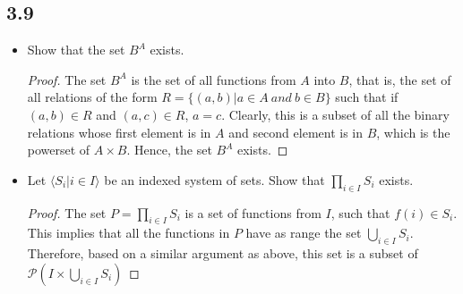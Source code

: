 \subsection*{3.9}

\begin{itemize} 
\item Show that the set $B^{A}$ exists.

\begin{proof}
    The set $B^A$ is the set of all functions from $A$ into $B$, that is, the set of all relations of the form $R = \{(a,b)| a\in A~and~b \in B\}$ such that if $(a,b) \in R$ and $(a, c) \in R$, $a = c$. Clearly, this is a subset of all the binary relations whose first element is in $A$ and second element is in $B$, which is the powerset of $A \times B$. Hence, the set $B^A$ exists.
\end{proof}

\item Let $\langle S_i | i \in I \rangle$ be an indexed system of sets. Show that $\prod_{i \in I} S_i$ exists.

\begin{proof}
    The set $P = \prod_{i \in I} S_i$ is a set of functions from $I$, such that $f(i) \in S_i$. This implies that all the functions in $P$ have as range the set $\bigcup_{i \in I} S_i$. Therefore, based on a similar argument as above, this set is a subset of $\mathcal{P}(I \times \bigcup_{i \in I} S_i)$
\end{proof}

\end{itemize}

